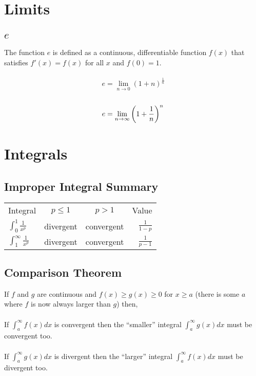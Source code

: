 \documentclass[12pt]{article}
\begin{document}
\section{Limits}

\subsection{$e$}

The function $e$ is defined as a continuous, differentiable function
$f(x)$ that satisfies $f'(x) = f(x)$ for all $x$ and $f(0) = 1$.\\
\\
\begin{displaymath}
    e = \displaystyle\lim_{n \to 0} \left(1 + n\right)^{\frac{1}{n}}
\end{displaymath}
\\
\begin{displaymath}
    e = \lim_{n \to \infty} \left(1 + \frac{1}{n}\right)^n\\
\end{displaymath}


\section{Integrals}


\subsection{Improper Integral Summary}

\def\arraystretch{3}
\begin{tabular}{lccr}
    Integral & $p \leq 1$ & $p > 1$ & Value\\
    $\displaystyle\int_{0}^{1} \frac{1}{x^p}$ & divergent & convergent & $\displaystyle\frac{1}{1-p}$\\
    $\displaystyle\int_{1}^{\infty} \frac{1}{x^p}$ & divergent & convergent & $\displaystyle\frac{1}{p-1}$\\
\end{tabular}


\subsection{Comparison Theorem}

If $f$ and $g$ are continuous and
$f(x) \geq g(x) \geq 0$ for $x \geq a$
(there is some $a$ where $f$ is now always larger than $g$)
then,\\
\\
If $\int_{a}^{\infty} f(x)dx$ is convergent then the ``smaller'' integral
$\int_{a}^{\infty} g(x)dx$ must be convergent too.\\
\\
If $\int_{a}^{\infty} g(x)dx$ is divergent then the ``larger'' integral
$\int_{a}^{\infty} f(x)dx$ must be divergent too.\\
\end{document}
